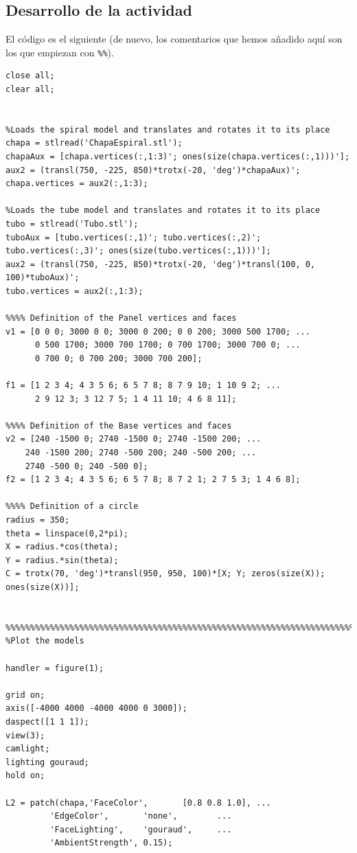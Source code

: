 \documentclass{article}
\begin{document}
\subsection{Desarrollo de la actividad}
El código es el siguiente (de nuevo, los comentarios que hemos añadido aquí son los que empiezan con {\tt \%\%}).
\begin{lstlisting}[frame=single]
close all;
clear all;


%Loads the spiral model and translates and rotates it to its place
chapa = stlread('ChapaEspiral.stl');
chapaAux = [chapa.vertices(:,1:3)'; ones(size(chapa.vertices(:,1)))'];
aux2 = (transl(750, -225, 850)*trotx(-20, 'deg')*chapaAux)';
chapa.vertices = aux2(:,1:3);

%Loads the tube model and translates and rotates it to its place
tubo = stlread('Tubo.stl');
tuboAux = [tubo.vertices(:,1)'; tubo.vertices(:,2)'; tubo.vertices(:,3)'; ones(size(tubo.vertices(:,1)))'];
aux2 = (transl(750, -225, 850)*trotx(-20, 'deg')*transl(100, 0, 100)*tuboAux)';
tubo.vertices = aux2(:,1:3);

%%%% Definition of the Panel vertices and faces  
v1 = [0 0 0; 3000 0 0; 3000 0 200; 0 0 200; 3000 500 1700; ...
      0 500 1700; 3000 700 1700; 0 700 1700; 3000 700 0; ...
      0 700 0; 0 700 200; 3000 700 200];

f1 = [1 2 3 4; 4 3 5 6; 6 5 7 8; 8 7 9 10; 1 10 9 2; ...
      2 9 12 3; 3 12 7 5; 1 4 11 10; 4 6 8 11];

%%%% Definition of the Base vertices and faces 
v2 = [240 -1500 0; 2740 -1500 0; 2740 -1500 200; ...
    240 -1500 200; 2740 -500 200; 240 -500 200; ...
    2740 -500 0; 240 -500 0];
f2 = [1 2 3 4; 4 3 5 6; 6 5 7 8; 8 7 2 1; 2 7 5 3; 1 4 6 8];

%%%% Definition of a circle 
radius = 350;      
theta = linspace(0,2*pi);          
X = radius.*cos(theta);  
Y = radius.*sin(theta);  
C = trotx(70, 'deg')*transl(950, 950, 100)*[X; Y; zeros(size(X)); ones(size(X))];


%%%%%%%%%%%%%%%%%%%%%%%%%%%%%%%%%%%%%%%%%%%%%%%%%%%%%%%%%%%%%%%%%%%%%%%%%%%
%Plot the models

handler = figure(1);

grid on;
axis([-4000 4000 -4000 4000 0 3000]);
daspect([1 1 1]);
view(3); 
camlight;
lighting gouraud;
hold on;

L2 = patch(chapa,'FaceColor',       [0.8 0.8 1.0], ...
         'EdgeColor',       'none',        ...
         'FaceLighting',    'gouraud',     ...
         'AmbientStrength', 0.15);


\end{lstlisting}
\end{document}
